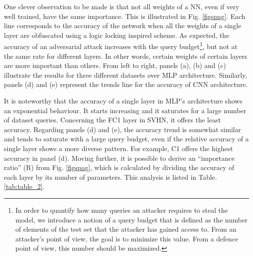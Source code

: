 \documentclass[10pt, twocolumn, conference]{IEEEtran}
\begin{document}
One clever observation to be made is that not all weights of a NN, even if very well trained, have the same importance. This is illustrated in Fig. \ref{figspag}. Each line corresponds to the accuracy of the network when all the weights of a single layer are obfuscated using a logic locking inspired scheme. As expected, the accuracy of an adversarial attack increases with the query budget\footnote{In order to quantify how many queries an attacker requires to steal the model, we introduce a notion of a query budget that is defined as the number of elements of the test set that the attacker has gained access to. From an attacker's point of view, the goal is to minimize this value. From a defence point of view, this number should be maximized.}, but not at the same rate for different layers. In other words, certain weights of certain layers are more important than others. From left to right, panels (a), (b) and (c) illustrate the results for three different datasets over MLP architecture. Similarly, panels (d) and (e) represent the trends line for the accuracy of CNN architecture.

It is noteworthy that the accuracy of a single layer in MLP's architecture shows an exponential behaviour. It starts increasing and it saturates for a large number of dataset queries. Concerning the FC1 layer in SVHN, it offers the least accuracy. Regarding panels (d) and (e), the accuracy trend is somewhat similar and tends to saturate with a large query budget, even if the relative accuracy of a single layer shows a more diverse pattern. For example, C1 offers the highest accuracy in panel (d). Moving further, it is possible to derive an ``importance ratio'' (R) from Fig. \ref{figspag}, which is calculated by dividing the accuracy of each layer by its number of parameters. This analysis is listed in Table. \ref{tab:table_2}.


\end{document}
